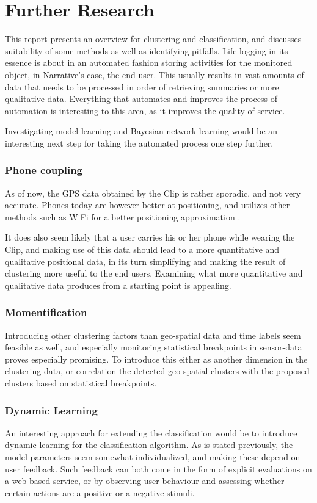 \section{Further Research}
This report presents an overview for clustering and classification, and 
discusses suitability of some methods as well as identifying pitfalls. 
Life-logging in its essence is about in an automated fashion storing 
activities for the monitored object, in Narrative's case, the end user. 
This usually results in vast amounts of data that needs to be processed 
in order of retrieving summaries or more qualitative data. Everything 
that automates and improves the process of automation is interesting to
this area, as it improves the quality of service. 

Investigating model learning and Bayesian network learning would be an 
interesting next step for taking the automated process one step further.

\subsubsection{Phone coupling}
As of now, the GPS data obtained by the Clip is rather sporadic, and
not very accurate. Phones today are 
however better at positioning, and utilizes other methods such as 
WiFi for a better positioning approximation \cite{iphone-wifi}.

It does also seem likely that a user carries his or her phone while 
wearing the Clip, and making use of this data should lead to a 
more quantitative and qualitative positional data, in its turn 
simplifying and making the result of clustering more useful to the
end users. Examining what more quantitative and qualitative data 
produces from a starting point is appealing.

\subsubsection{Momentification}
Introducing other clustering factors than geo-spatial data and 
time labels seem feasible as well, and especially monitoring 
statistical breakpoints in sensor-data proves especially promising. 
To introduce this either as another dimension in the clustering data, 
or correlation the detected geo-spatial clusters with the proposed 
clusters based on statistical breakpoints.

\subsubsection{Dynamic Learning}
An interesting approach for extending the classification would be to
introduce dynamic learning for the classification algorithm. As is 
stated previously, the model parameters seem somewhat individualized, 
and making these depend on user feedback. Such feedback can both 
come in the form of explicit evaluations on a web-based service, or 
by observing user behaviour and assessing whether certain actions are
a positive or a negative stimuli.
